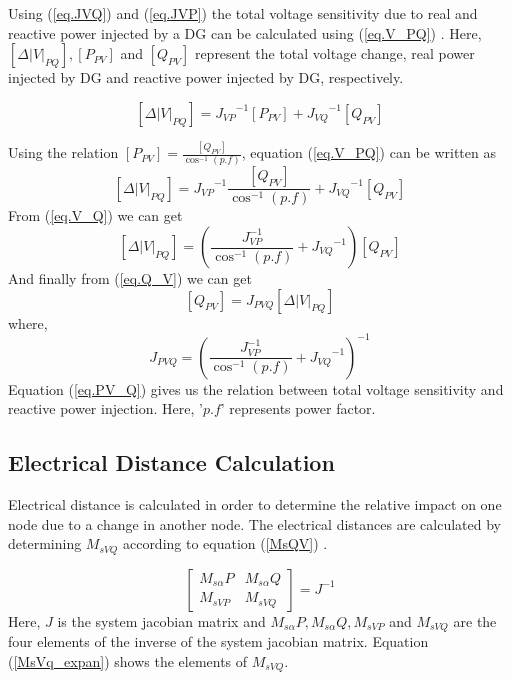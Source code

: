 Using (\ref{eq.JVQ}) and (\ref{eq.JVP}) the total voltage sensitivity due to real and reactive power injected by a DG can be calculated using (\ref{eq.V_PQ}) \cite{Th_ali}. Here, $[\Delta|V|_{PQ}], [P_{PV}] $ and $[Q_{PV}]$ represent the total voltage change, real power injected by DG and reactive power injected by DG, respectively.

\begin{equation}\label{eq.V_PQ}
[\Delta|V|_{PQ}] ={ J_{VP}}^{-1} [P_{PV}]+{ J_{VQ}}^{-1} [Q_{PV}]
\end{equation}

Using the relation $[P_{PV}] = \frac{[Q_{PV}]}{\cos^{-1}(p.f)}$, equation (\ref{eq.V_PQ}) can be written as
\begin{equation}\label{eq.V_Q}
 [\Delta|V|_{PQ}] ={ J_{VP}}^{-1}\frac{[Q_{PV}]}{\cos^{-1}(p.f)} +{ J_{VQ}}^{-1} [Q_{PV}]
\end{equation}
From (\ref{eq.V_Q}) we can get
\begin{equation}\label{eq.Q_V}
 [\Delta|V|_{PQ}] =( \frac{J_{VP}^{-1}}{\cos^{-1}(p.f)} +{ J_{VQ}}^{-1}) [Q_{PV}]
\end{equation}
And finally from (\ref{eq.Q_V}) we can get
\begin{equation}\label{eq.PV_Q}
 [Q_{PV}] = J_{PVQ} [\Delta|V|_{PQ}] 
\end{equation}
where,
\begin{equation}
J_{PVQ} = ( \frac{J_{VP}^{-1}}{\cos^{-1}(p.f)} +{ J_{VQ}}^{-1})^{-1}
\end{equation}
 Equation (\ref{eq.PV_Q}) gives us the relation between total voltage sensitivity and reactive power injection. Here, '$p.f$' represents power factor.

\subsection{Electrical Distance Calculation}
Electrical distance is calculated in order to determine the relative impact on one node due to a change in another node. The electrical distances are calculated by determining $M_{sVQ}$ according to equation (\ref{MsQV}) \cite{int1}.

\begin{equation}\label{MsQV}
\begin{bmatrix}
M_{s\alpha}P & M_{s\alpha}Q \\ 
M_{sVP} & M_{sVQ} 
\end{bmatrix} = J^{-1}
\end{equation}
 Here, $J$ is the system jacobian matrix and $M_{s\alpha}P, M_{s\alpha}Q, M_{sVP}$ and $M_{sVQ}$  are the four elements of the inverse of the system jacobian matrix. Equation (\ref{MsVq_expan}) shows the elements of $M_{sVQ}$. \cite{int1}


